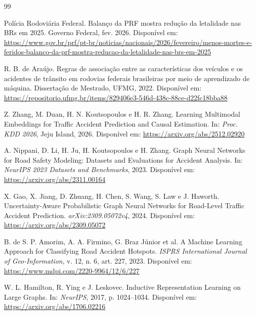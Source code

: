 \documentclass[12pt]{article}
\begin{document}
\begin{thebibliography}{99}

Polícia Rodoviária Federal.
\newblock Balanço da PRF mostra redução da letalidade nas BRs em 2025.
\newblock Governo Federal, fev. 2026.
\newblock Disponível em: \url{https://www.gov.br/prf/pt-br/noticias/nacionais/2026/fevereiro/menos-mortes-e-feridos-balanco-da-prf-mostra-reducao-da-letalidade-nas-brs-em-2025}

R. B. de Araújo.
\newblock Regras de associação entre as características dos veículos e os
acidentes de trânsito em rodovias federais brasileiras por meio de
aprendizado de máquina.
\newblock Dissertação de Mestrado, UFMG, 2022.
\newblock Disponível em: \url{https://repositorio.ufmg.br/items/829406e3-546d-438c-88ce-d22fc18bba88}

Z. Zhang, M. Duan, H. N. Koutsopoulos e H. R. Zhang.
\newblock Learning Multimodal Embeddings for Traffic Accident Prediction
and Causal Estimation.
\newblock In: \textit{Proc. KDD 2026}, Jeju Island, 2026.
\newblock Disponível em: \url{https://arxiv.org/abs/2512.02920}

A. Nippani, D. Li, H. Ju, H. Koutsopoulos e H. Zhang.
\newblock Graph Neural Networks for Road Safety Modeling: Datasets and
Evaluations for Accident Analysis.
\newblock In: \textit{NeurIPS 2023 Datasets and Benchmarks}, 2023.
\newblock Disponível em: \url{https://arxiv.org/abs/2311.00164}

X. Gao, X. Jiang, D. Zhuang, H. Chen, S. Wang, S. Law e J. Haworth.
\newblock Uncertainty-Aware Probabilistic Graph Neural Networks for
Road-Level Traffic Accident Prediction.
\newblock \textit{arXiv:2309.05072v4}, 2024.
\newblock Disponível em: \url{https://arxiv.org/abs/2309.05072}

B. de S. P. Amorim, A. A. Firmino, G. Braz Júnior et al.
\newblock A Machine Learning Approach for Classifying Road Accident
Hotspots.
\newblock \textit{ISPRS International Journal of Geo-Information}, v. 12,
n. 6, art. 227, 2023.
\newblock Disponível em: \url{https://www.mdpi.com/2220-9964/12/6/227}

W. L. Hamilton, R. Ying e J. Leskovec.
\newblock Inductive Representation Learning on Large Graphs.
\newblock In: \textit{NeurIPS}, 2017, p. 1024--1034.
\newblock Disponível em: \url{https://arxiv.org/abs/1706.02216}


\end{thebibliography}
\end{document}
